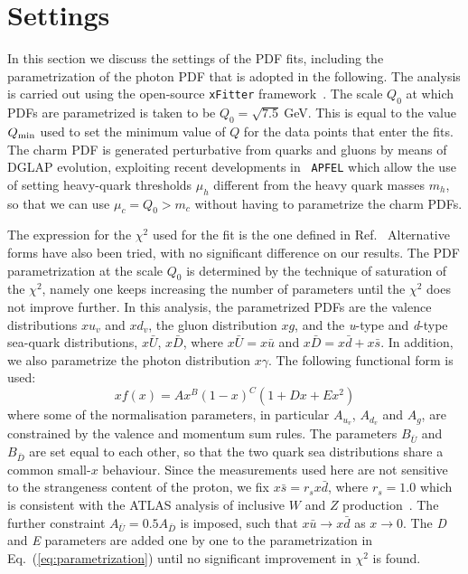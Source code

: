 \section{Settings}
\label{sec:fitsettings}

In this section we discuss the settings of the PDF fits, including the
parametrization of the photon PDF that is adopted in the following.
%
The analysis is carried out using the open-source {\tt xFitter}
framework~\cite{Alekhin:2014irh}.
%
The scale $Q_0$ at which PDFs are parametrized is taken to be
$Q_0 = \sqrt{7.5}~$GeV.
%
This is equal to the value $Q_{\rm min}$ used to set the minimum value
of $Q$ for the data points that enter the fits.
%
The charm PDF is generated perturbative from quarks and gluons by
means of DGLAP evolution, exploiting recent developments in {\tt
  APFEL} which allow the use of setting heavy-quark thresholds $\mu_h$
different from the heavy quark masses $m_h$, so that we can use
$\mu_c=Q_0 > m_c$ without having to parametrize the charm PDFs.

The expression for the $\chi^2$ used for the fit is the one defined in
Ref.~\cite{Aaron:2009aa}
%
Alternative forms have also been tried, with no significant difference
on our results.
% 
The PDF parametrization at the scale $Q_0$ is determined by the
technique of saturation of the $\chi^{2}$, namely one keeps increasing
the number of parameters until the $\chi^{2}$ does not improve
further.
%
In this analysis, the parametrized PDFs are the valence distributions
$xu_{v}$ and $xd_{v}$, the gluon distribution $xg$, and the
\textit{u}-type and \textit{d}-type sea-quark distributions,
$x\bar{U}$, $x\bar{D}$, where $x\bar{U} = x\bar{u}$ and
$x\bar{D} = x\bar{d} + x\bar{s}$.
%
In addition, we also parametrize the photon distribution $x\gamma$.
%
The following functional form is used:
\begin{equation}
  \label{eq:parametrization}
xf(x) = Ax^{B}(1-x)^{C}(1+Dx+Ex^{2})
\end{equation}
where some of the normalisation parameters, in particular $A_{u_{v}}$,
$A_{d_{v}}$ and $A_{g}$, are constrained by the valence and momentum
sum rules.
%
The parameters $B_{\bar{U}}$ and $B_{\bar{D}}$ are set equal to each
other, so that the two quark sea distributions share a common
small-$x$ behaviour.
%
Since the measurements used here are not sensitive to the strangeness
content of the proton, we fix $x\bar{s} = r_sx\bar{d}$, where
$r_s=1.0$ which is consistent with the ATLAS analysis of inclusive $W$
and $Z$ production~\cite{Aad:2012sb,Aaboud:2016btc}.
%
The further constraint $A_{\bar{U}} = 0.5 A_{\bar{D}}$ is imposed,
such that $x\bar{u} \to x\bar{d}$ as $x \to 0$.  The \textit{D} and
\textit{E} parameters are added one by one to the parametrization in
Eq.~(\ref{eq:parametrization}) until no significant improvement in
$\chi^{2}$ is found.


